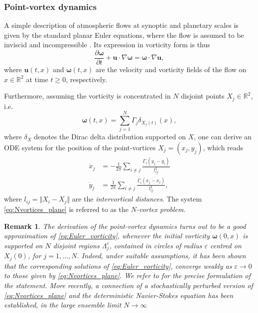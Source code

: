 \documentclass[a4paper]{article}
\numberwithin{equation}{section}
\newtheorem{remark}[theorem]{Remark}
\begin{document}
\subsubsection{Point-vortex dynamics}
A simple description of atmospheric flows at synoptic and planetary scales is given by the standard planar Euler equations, where the flow is assumed to be inviscid and incompressible \cite{Muller15}. Its expression in vorticity form is thus
\begin{equation}
\label{eq:Euler_vorticity}  
    \frac{\partial \bm{\omega}}{\partial t}+\bm{u}\cdot\nabla\bm{\omega}=\bm{\omega}\cdot \nabla \bm{u},
\end{equation}
where $\bm{u}(t,x)$ and $\bm{\omega}(t,x)$ are the velocity and vorticity fields of the flow on $x\in\mathbb{R}^2$ at time $t\geq0$, respectively.

Furthermore, assuming the vorticity is concentrated in $N$ disjoint points $X_j\in\mathbb{R}^2$, i.e.
\[
    \bm{\omega}(t,x)=\sum_{j=1}^N \Gamma_j \delta_{X_j(t)}(x),
\]
where $\delta_X$ denotes the Dirac delta distribution supported on $X$, one can derive an ODE system for the position of the point-vortices $X_j=(x_j,y_j)$, which reads \cite{Newton01}
 \begin{equation}
    \label{eq:Nvortices_plane}
        \begin{split}
            \dot{x}_j & =-\frac{1}{2\pi} \sum_{i\neq j} \frac{\Gamma_i(y_j-y_i)}{l_{ij}^2} \\
            \dot{y}_j & = \frac{1}{2\pi} \sum_{i\neq j} \frac{\Gamma_i(x_j-x_i)}{l_{ij}^2},
        \end{split}
    \end{equation}
    where $l_{ij}=\Vert X_i-X_j \Vert$ are the \textit{intervortical distances}. The system \eqref{eq:Nvortices_plane} is referred to as the \textit{$N$-vortex problem}. 
    
\begin{remark}
The derivation of the point-vortex dynamics turns out to be a good approximation of \eqref{eq:Euler_vorticity}, whenever the initial vorticity $\bm{\omega}(0,x)$ is supported on $N$ disjoint regions $\Lambda_j^{\varepsilon}$, contained in circles of radius $\varepsilon$ centred on $X_j(0)$, for $j=1,\ldots, N$. Indeed, under suitable assumptions, it has been shown that the corresponding solutions of \eqref{eq:Euler_vorticity}, converge weakly as $\varepsilon\rightarrow0$ to those given by \eqref{eq:Nvortices_plane}. We refer to \cite[Theorem 2.1]{Marchioro93} for the precise formulation of the statement. More recently, a connection of a stochastically perturbed version of \eqref{eq:Nvortices_plane} and the deterministic Navier-Stokes equation has been established, in the large ensemble limit $N\rightarrow\infty$ \cite{Flandoli24}
\end{remark}
\end{document}
